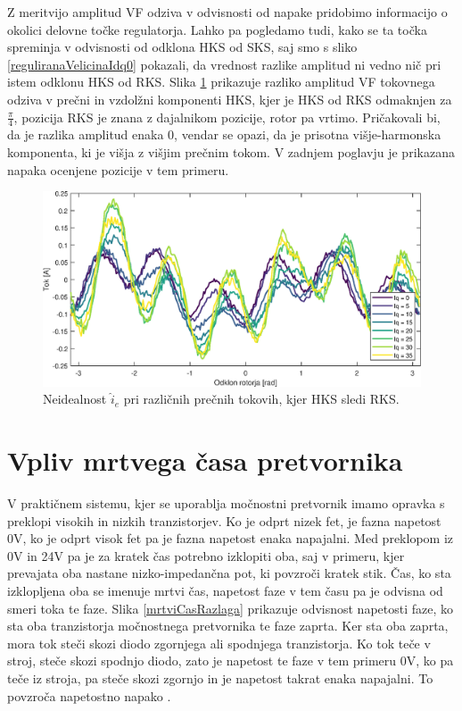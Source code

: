\documentclass[a4paper,twoside,openright,12pt,slovene]{book}
\begin{document}
Z meritvijo amplitud VF odziva v odvisnosti od napake pridobimo informacijo o okolici delovne točke regulatorja. Lahko pa pogledamo tudi, kako se ta točka spreminja v odvisnosti od odklona HKS od SKS,
saj smo s sliko \ref{reguliranaVelicinaIdq0} pokazali, da vrednost razlike amplitud ni vedno nič pri istem odklonu HKS od RKS. Slika \ref{tokovniOdzivIs_HKSslediRKS_diff} prikazuje razliko amplitud VF
tokovnega odziva v prečni in vzdolžni komponenti HKS, kjer je HKS od RKS odmaknjen za $\frac{\pi}{4}$, pozicija RKS je znana z dajalnikom pozicije, rotor pa vrtimo. Pričakovali bi, da je razlika
amplitud enaka 0, vendar se opazi, da je prisotna višje-harmonska komponenta, ki je višja z višjim prečnim tokom. V zadnjem poglavju je prikazana napaka ocenjene pozicije v tem primeru.

\begin{figure}[!htbp]
    \centering
    \includegraphics[width=1\columnwidth]{Slike/tokovniOdzivIs_HKSslediRKS_diff.eps}
    \caption{\label{tokovniOdzivIs_HKSslediRKS_diff} Neidealnost $\hat{i}_{e}$ pri različnih prečnih tokovih, kjer HKS sledi RKS.}
\end{figure}

\section{Vpliv mrtvega časa pretvornika}

V praktičnem sistemu, kjer se uporablja močnostni pretvornik imamo opravka s preklopi visokih in nizkih tranzistorjev. Ko je odprt nizek fet, je fazna napetost 0V, ko je odprt visok fet pa je fazna
napetost enaka napajalni. Med preklopom iz 0V in 24V pa je za kratek čas potrebno izklopiti oba, saj v primeru, kjer prevajata oba nastane nizko-impedančna pot, ki povzroči kratek stik. Čas, ko sta
izklopljena oba se imenuje mrtvi čas, napetost faze v tem času pa je odvisna od smeri toka te faze. Slika \ref{mrtviCasRazlaga} prikazuje odvisnost napetosti faze, ko sta oba tranzistorja močnostnega
pretvornika te faze zaprta. Ker sta oba zaprta, mora tok steči skozi diodo zgornjega ali spodnjega tranzistorja. Ko tok teče v stroj, steče skozi spodnjo diodo, zato je napetost te faze v tem primeru
0V, ko pa teče iz stroja, pa steče skozi zgornjo in je napetost takrat enaka napajalni. To povzroča napetostno napako \cite{ambrovzivc2016elektrivcni}.
\end{document}
